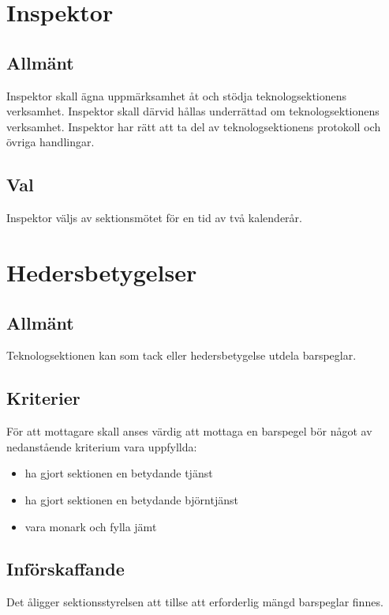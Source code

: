 \documentclass[a4paper]{dtek}
\begin{document}
\section{Inspektor}
\subsection{Allmänt}
Inspektor skall ägna uppmärksamhet åt och stödja teknologsektionens verksamhet. Inspektor skall därvid hållas underrättad om teknologsektionens verksamhet. Inspektor har rätt att ta del av teknologsektionens protokoll och övriga handlingar.
\subsection{Val}
Inspektor väljs av sektionsmötet för en tid av två kalenderår.
\newpage

\section{Hedersbetygelser}
\subsection{Allmänt}
Teknologsektionen kan som tack eller hedersbetygelse utdela barspeglar.
\subsection{Kriterier}
För att mottagare skall anses värdig att mottaga en barspegel bör något av nedanstående kriterium vara uppfyllda:
\begin{itemize}
\item ha gjort sektionen en betydande tjänst
\item ha gjort sektionen en betydande björntjänst
\item vara monark och fylla jämt
\end{itemize}
\subsection{Införskaffande}
Det åligger sektionsstyrelsen att tillse att erforderlig mängd barspeglar finnes.
\end{document}
